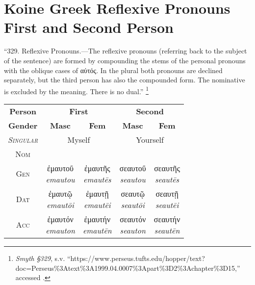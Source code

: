 \documentclass[10pt]{memoir}
\newcommand{\tsc}[1]{\textsc{#1}}
\newcommand{\grc}[1]{\fontspec{Inter}#1}
\newcommand{\trc}[1]{\textit{\fontspec{Tinos}#1}}
\newcommand{\linkfoot}[3]{\footnote{\emph{#1}, s.v. ``{#2},'' accessed \printdate{#3}.}}
\begin{document}
    \section*{Koine Greek Reflexive Pronouns First and Second Person}

    ``329. Reflexive Pronouns.—The reflexive pronouns (referring back to the subject of the sentence) are formed by compounding the stems of the personal pronouns with the oblique cases of \grc{αὐτός}\fontspec{}. In the plural both pronouns are declined separately, but the third person has also the compounded form. The nominative is excluded by the meaning. There is no dual.''
    \linkfoot{Smyth §329}{https://www.perseus.tufts.edu/hopper/text?doc=Perseus\%3Atext\%3A1999.04.0007\%3Apart\%3D2\%3Achapter\%3D15}{2025-05-15}

    \begin{table}[H]
        \begin{tabular}{c|cccc}
            \textbf{Person} & \multicolumn{2}{c}{\textbf{First}} & \multicolumn{2}{c}{\textbf{Second}} \\
            \textbf{Gender} & \textbf{Masc} & \textbf{Fem} & \textbf{Masc} & \textbf{Fem} \\

            \hline
            \emph{\tsc{Singular}} & \multicolumn{2}{c}{Myself} & \multicolumn{2}{c}{Yourself} \\
             \tsc{Nom} & \makecell{--} & \makecell{--}
            & \makecell{--} & \makecell{--}\\

            \tsc{Gen} & \makecell{\grc{ἐμαυτοῦ} \\ \trc{emautou}} & \makecell{\grc{ἐμαυτῆς} \\ \trc{emautēs}}
            & \makecell{\grc{σεαυτοῦ} \\ \trc{seautou}} & \makecell{\grc{σεαυτῆς} \\ \trc{seautēs}}\\

            \tsc{Dat} & \makecell{\grc{ἐμαυτῷ} \\ \trc{emautōi}} & \makecell{\grc{ἐμαυτῇ} \\ \trc{emautēi}}
            & \makecell{\grc{σεαυτῷ} \\ \trc{seautōi}} & \makecell{\grc{σεαυτῇ} \\ \trc{seautēi}}\\

            \tsc{Acc} & \makecell{\grc{ἐμαυτόν} \\ \trc{emauton}} & \makecell{\grc{ἐμαυτήν} \\ \trc{emautēn}}
            & \makecell{\grc{σεαυτόν} \\ \trc{seauton}} & \makecell{\grc{σεαυτήν} \\ \trc{seautēn}}\\


\end{tabular}
\end{table}
\end{document}
